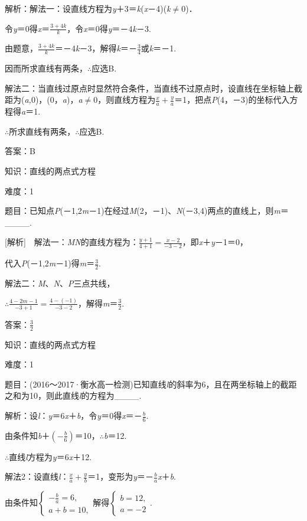 \documentclass{article} %
\begin{document}
解析：解法一：设直线方程为\textit{y}＋3＝\textit{k}(\textit{x}－4)(\textit{k}$\mathrm{\neq}$0)．

令\textit{y}＝0得\textit{x}＝$\frac{3+4k}{k}$，令\textit{x}＝0得\textit{y}＝－4\textit{k}－3.

由题意，$\frac{3+4k}{k}$＝－4\textit{k}－3，解得\textit{k}＝－$\frac{3}{4}$或\textit{k}＝－1.

因而所求直线有两条，$\mathrm{\therefore}$应选B.

解法二：当直线过原点时显然符合条件，当直线不过原点时，设直线在坐标轴上截距为(\textit{a,}0)，(0，\textit{a})，\textit{a}$\mathrm{\neq}$0，则直线方程为$\frac{x}{a}+\frac{y}{a}$＝1，把点\textit{P}(4，－3)的坐标代入方程得\textit{a}＝1.

$\mathrm{\therefore}$所求直线有两条，$\mathrm{\therefore}$应选B.

答案：B

知识：直线的两点式方程

难度：1

题目：已知点\textit{P}(－1,2\textit{m}－1)在经过\textit{M}(2，－1)、\textit{N}(－3,4)两点的直线上，则\textit{m}＝\_\_\_\_.

[解析]　解法一：\textit{MN}的直线方程为：$\frac{y+1}{4+1}=\frac{x-2}{-3-2}$，即\textit{x}＋\textit{y}－1＝0，

代入\textit{P}(－1,2\textit{m}－1)得\textit{m}＝$\frac{3}{2}$.

解法二：\textit{M}、\textit{N}、\textit{P}三点共线，

$\mathrm{\therefore}\frac{4-2m-1}{-3+1}=\frac{4-(-1)}{-3-2}$，解得\textit{m}＝$\frac{3}{2}$.

答案：$\frac{3}{2}$

知识：直线的两点式方程

难度：1

题目：(2016～2017·衡水高一检测)已知直线\textit{l}的斜率为6，且在两坐标轴上的截距之和为10，则此直线\textit{l}的方程为\_\_\_\_.

解析：设\textit{l}：\textit{y}＝6\textit{x}＋\textit{b}，令\textit{y}＝0得\textit{x}＝－$\frac{b}{6}$.

由条件知\textit{b}＋$(-\frac{b}{6})$＝10，$\mathrm{\therefore}$\textit{b}＝12.

$\mathrm{\therefore}$直线\textit{l}方程为\textit{y}＝6\textit{x}＋12.

解法2：设直线\textit{l}：$\frac{x}{a}+\frac{y}{b}$＝1，变形为\textit{y}＝－$\frac{b}{a}$\textit{x}＋\textit{b}.

由条件知$\left\{\begin{array}{l} -\frac{b}{a}=6,\\ a+b=10, \end{array}\right.$解得$\left\{\begin{array}{l} b=12,\\ a=-2 \end{array}\right.$.
\end{document}
